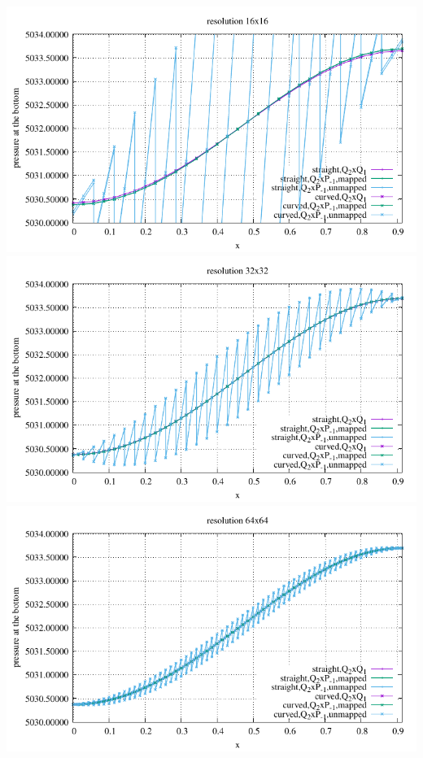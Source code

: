 \begin{center}
\includegraphics[width=14cm]{python_codes/fieldstone_25/results/isoviscous/pbottom16.pdf}\\
\includegraphics[width=14cm]{python_codes/fieldstone_25/results/isoviscous/pbottom32.pdf}\\
\includegraphics[width=14cm]{python_codes/fieldstone_25/results/isoviscous/pbottom64.pdf}\\

\end{center}
